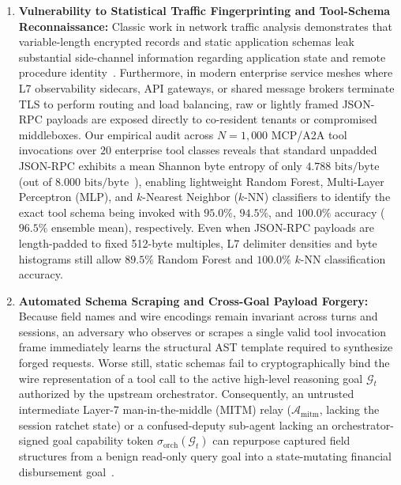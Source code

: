 \documentclass[conference,10pt]{IEEEtran}
\begin{document}
\begin{enumerate}
    \item \textbf{Vulnerability to Statistical Traffic Fingerprinting and Tool-Schema Reconnaissance:} Classic work in network traffic analysis demonstrates that variable-length encrypted records and static application schemas leak substantial side-channel information regarding application state and remote procedure identity~\cite{wright2009traffic, dyer2012peekaboo, panchenko2016website, sirinam2018deep}. Furthermore, in modern enterprise service meshes where L7 observability sidecars, API gateways, or shared message brokers terminate TLS to perform routing and load balancing, raw or lightly framed JSON-RPC payloads are exposed directly to co-resident tenants or compromised middleboxes. Our empirical audit across $N = 1{,}000$ MCP/A2A tool invocations over $20$ enterprise tool classes reveals that standard unpadded JSON-RPC exhibits a mean Shannon byte entropy of only $4.788\text{ bits/byte}$ (out of $8.000\text{ bits/byte}$~\cite{shannon1948mathematical}), enabling lightweight Random Forest, Multi-Layer Perceptron (MLP), and $k$-Nearest Neighbor ($k$-NN) classifiers to identify the exact tool schema being invoked with $95.0\%$, $94.5\%$, and $100.0\%$ accuracy ($96.5\%$ ensemble mean), respectively. Even when JSON-RPC payloads are length-padded to fixed 512-byte multiples, L7 delimiter densities and byte histograms still allow $89.5\%$ Random Forest and $100.0\%$ $k$-NN classification accuracy.
    \item \textbf{Automated Schema Scraping and Cross-Goal Payload Forgery:} Because field names and wire encodings remain invariant across turns and sessions, an adversary who observes or scrapes a single valid tool invocation frame immediately learns the structural AST template required to synthesize forged requests. Worse still, static schemas fail to cryptographically bind the wire representation of a tool call to the active high-level reasoning goal $\mathcal{G}_t$ authorized by the upstream orchestrator. Consequently, an untrusted intermediate Layer-7 man-in-the-middle (MITM) relay ($\mathcal{A}_{\text{mitm}}$, lacking the session ratchet state) or a confused-deputy sub-agent lacking an orchestrator-signed goal capability token $\sigma_{\text{orch}}(\mathcal{G}_t)$ can repurpose captured field structures from a benign read-only query goal into a state-mutating financial disbursement goal~\cite{debenedetti2024agentdojo, zhan2024injecagent}.

\end{enumerate}
\end{document}
